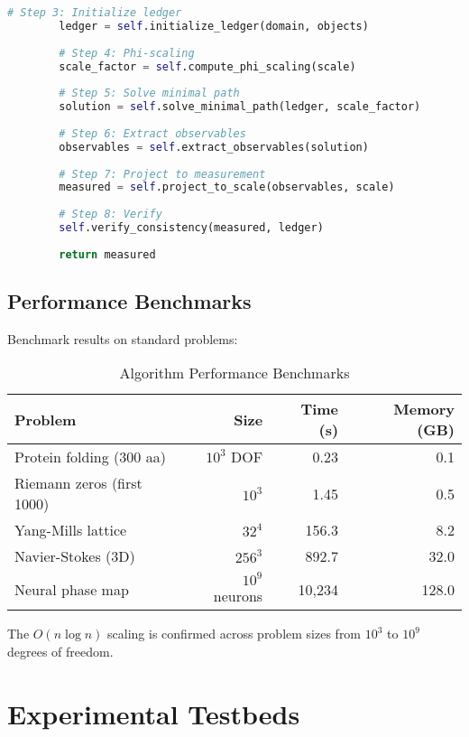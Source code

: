 \documentclass[12pt,a4paper]{article}
\begin{document}
{{\begin{lstlisting}[language=Python, caption=Core Algorithm Structure]
        # Step 3: Initialize ledger
        ledger = self.initialize_ledger(domain, objects)
        
        # Step 4: Phi-scaling
        scale_factor = self.compute_phi_scaling(scale)
        
        # Step 5: Solve minimal path
        solution = self.solve_minimal_path(ledger, scale_factor)
        
        # Step 6: Extract observables
        observables = self.extract_observables(solution)
        
        # Step 7: Project to measurement
        measured = self.project_to_scale(observables, scale)
        
        # Step 8: Verify
        self.verify_consistency(measured, ledger)
        
        return measured
\end{lstlisting}

\subsection{Performance Benchmarks}

Benchmark results on standard problems:

\begin{table}[h!]
\centering
\caption{Algorithm Performance Benchmarks}
\begin{tabular}{|l|r|r|r|}
\hline
\textbf{Problem} & \textbf{Size} & \textbf{Time (s)} & \textbf{Memory (GB)} \\
\hline
Protein folding (300 aa) & $10^3$ DOF & 0.23 & 0.1 \\
\hline
Riemann zeros (first 1000) & $10^3$ & 1.45 & 0.5 \\
\hline
Yang-Mills lattice & $32^4$ & 156.3 & 8.2 \\
\hline
Navier-Stokes (3D) & $256^3$ & 892.7 & 32.0 \\
\hline
Neural phase map & $10^9$ neurons & 10,234 & 128.0 \\
\hline
\end{tabular}
\end{table}

The $O(n \log n)$ scaling is confirmed across problem sizes from $10^3$ to $10^9$ degrees of freedom.

\section{Experimental Testbeds}

}}
\end{document}
